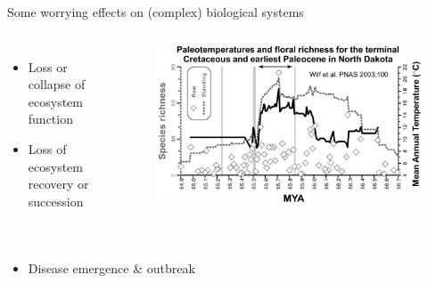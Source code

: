 \documentclass[xcolor={usenames,x11names},compress]{beamer}
\renewcommand{\(}{\begin{columns}}
\renewcommand{\)}{\end{columns}}
\newcommand{\<}[1]{\begin{column}{#1}}
\renewcommand{\>}{\end{column}}
\begin{document}
\begin{frame}{Some worrying effects on (complex) biological systems}

\begin{columns}[c]
		\begin{itemize}[<+->]\setlength{\itemindent}{0em}
			\item Loss or collapse of ecosystem function
			
			\item Loss of ecosystem recovery or succession

		\end{itemize}

    \begin{figure}
			\includegraphics[width=\textwidth]{Paleo.pdf}		
		\end{figure}
\end{columns}

\pause

\begin{columns}[c]
		\begin{itemize}\setlength{\itemindent}{0em}
			\item Disease emergence \& outbreak
		\end{itemize}


\end{columns}
\end{frame}
\end{document}
